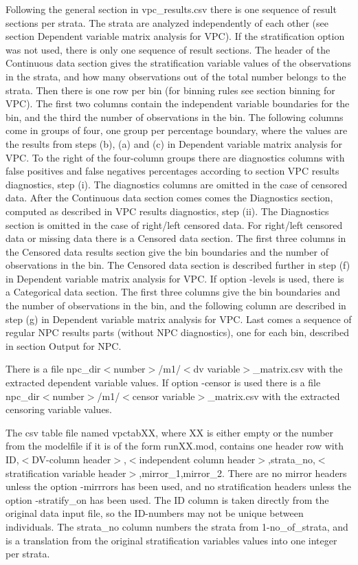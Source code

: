 Following the general section in vpc\_results.csv there is one sequence of result sections per strata. The strata are analyzed independently of each other (see section Dependent variable matrix analysis for VPC). If the stratification option was not used, there is only one sequence of result sections. The header of the Continuous data section gives the stratification variable values of the observations in the strata, and how many observations out of the total number belongs to the strata. Then there is one row per bin (for binning rules see section binning for VPC). The first two columns contain the independent variable boundaries for the bin, and the third the number of observations in the bin. The following columns come in groups of four, one group per percentage boundary, where the values are the results from steps (b), (a) and (c) in Dependent variable matrix analysis for VPC. To the right of the four-column groups there are diagnostics columns with false positives and false negatives percentages according to section VPC results diagnostics, step (i). The diagnostics columns are omitted in the case of censored data. After the Continuous data section comes comes the Diagnostics section, computed as described in VPC results diagnostics, step (ii). The Diagnostics section is omitted in the case of right/left censored data. For right/left censored data or missing data there is a Censored data section. The first three columns in the Censored data results section give the bin boundaries and the number of observations in the bin. The Censored data section is described further in step (f) in Dependent variable matrix analysis for VPC. If option -levels is used, there is a Categorical data section. The first three columns give the bin boundaries and the number of observations in the bin, and the following column are described in step (g) in Dependent variable matrix analysis for VPC. Last comes a sequence of regular NPC results parts (without NPC diagnostics), one for each bin, described in section Output for NPC. 

There is a file npc\_dir$<$number$>$/m1/$<$dv variable$>$\_matrix.csv with the extracted dependent variable values. If option -censor is used there is a file npc\_dir$<$number$>$/m1/$<$censor variable$>$\_matrix.csv with the extracted censoring variable values.

The csv table file named vpctabXX, where XX is either empty or the number from the modelfile if it is of the form runXX.mod, contains one header row with ID,$<$DV-column header$>$,$<$independent column header$>$,strata\_no,$<$stratification variable header$>$,mirror\_1,mirror\_2. There are no mirror headers unless the option -mirrrors has been used, and no stratification headers unless the option -stratify\_on has been used. The ID column is taken directly from the original data input file, so the ID-numbers may not be unique between individuals. The strata\_no column numbers the strata from 1-no\_of\_strata, and is a translation from the original stratification variables values into one integer per strata.

